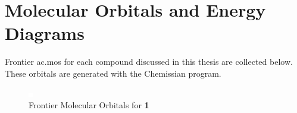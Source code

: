 \chapter{Molecular Orbitals and Energy Diagrams} \label{app.mos}

Frontier \glspl{ac.mo} for each compound discussed in this thesis are collected below. These orbitals are generated with the Chemissian program\autocite{chemissian}.

\begin{figure}[!h]
 \begin{center}
  \includegraphics[clip=true]{images/insertgraphic.eps}
 \end{center}
\caption{Frontier Molecular Orbitals for \textbf{1}}
\label{fig.mo1}
\end{figure}

